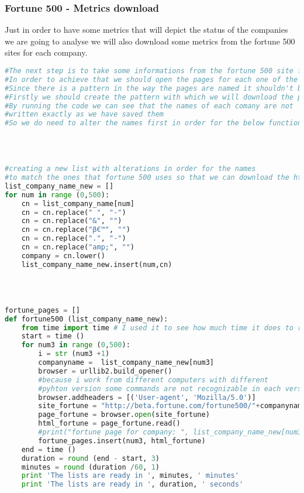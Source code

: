 \documentclass{article}
\begin{document}
\subsubsection{Fortune 500 - Metrics download}
Just in order to have some metrics that will depict the status of the companies we are going to analyse we will also download some metrics from the fortune 500 sites for each company.
\begin{lstlisting}[language=Python]
#The next step is to take some informations from the fortune 500 site for each company
#In order to achieve that we should open the pages for each one of the sites seperately
#Since there is a pattern in the way the pages are named it shouldn't be difficult
#Firstly we should create the pattern with which we will download the pages
#By running the code we can see that the names of each comany are not 
#written exactly as we have saved them
#So we do need to alter the names first in order for the below function to run
 


 
#creating a new list with alterations in order for the names
#to match the ones that fortune 500 uses so that we can download the html page
list_company_name_new = []
for num in range (0,500):
    cn = list_company_name[num]
    cn = cn.replace(" ", "-")
    cn = cn.replace("&", "")
    cn = cn.replace("β€™", "")
    cn = cn.replace(".", "-")
    cn = cn.replace("amp;", "")    
    company = cn.lower()
    list_company_name_new.insert(num,cn)
 


 
fortune_pages = []
def fortune500 (list_company_name_new):
    from time import time # I used it to see how much time it does to run the function
    start = time ()
    for num3 in range (0,500):
        i = str (num3 +1)    
        companyname =  list_company_name_new[num3]
        browser = urllib2.build_opener() 
        #because i work from different computers with different 
        #pyhton version some commands are not recognizable in each version
        browser.addheaders = [('User-agent', 'Mozilla/5.0')]
        site_fortune = "http://beta.fortune.com/fortune500/"+companyname+"-"+ i    
        page_fortune = browser.open(site_fortune)
        html_fortune = page_fortune.read()    
        #print("fortune page for company: ", list_company_name_new[num3],i)
        fortune_pages.insert(num3, html_fortune)
    end = time ()
    duration = round (end - start, 3)
    minutes = round (duration /60, 1)
    print 'The lists are ready in ', minutes, ' minutes'
    print 'The lists are ready in ', duration, ' seconds'
 



\end{lstlisting}
\end{document}
